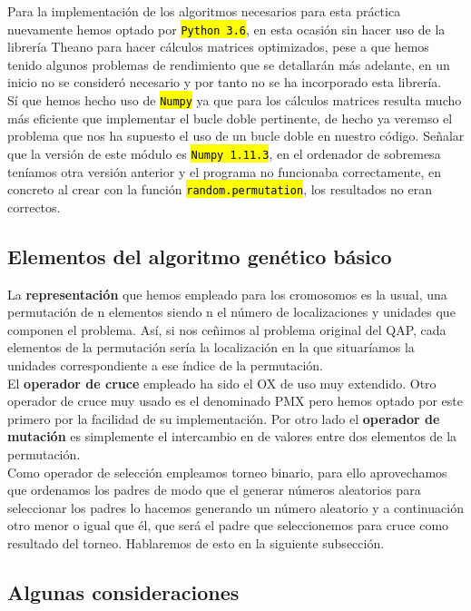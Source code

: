 \documentclass[10pt,a4paper]{article}
\newcommand{\code}[1]{\sethlcolor{light-gray}\hl{\texttt{#1}}} %
\begin{document}
Para la implementación de los algoritmos necesarios para esta práctica nuevamente hemos optado por \code{Python 3.6}, en esta ocasión sin hacer uso de la librería Theano para hacer cálculos matrices optimizados, pese a que hemos tenido algunos problemas de rendimiento que se detallarán más adelante, en un inicio no se consideró necesario y por tanto no se ha incorporado esta librería.\\

Sí que hemos hecho uso de \code{Numpy} ya que para los cálculos matrices resulta mucho más eficiente que implementar el bucle doble pertinente, de hecho ya veremso el problema que nos ha supuesto el uso de un bucle doble en nuestro código. Señalar que la versión de este módulo es \code{Numpy 1.11.3}, en el ordenador de sobremesa teníamos otra versión anterior y el programa no funcionaba correctamente, en concreto al crear con la función \code{random.permutation}, los resultados no eran correctos.

\subsection{Elementos del algoritmo genético básico}

La \textbf{representación} que hemos empleado para los cromosomos es la usual, una permutación de n elementos siendo n el número de localizaciones y unidades que componen el problema. Así, si nos ceñimos al problema original del QAP, cada elementos de la permutación sería la localización en la que situaríamos la unidades correspondiente a ese índice de la permutación.\\

El \textbf{operador de cruce} empleado ha sido el OX de uso muy extendido. Otro operador de cruce muy usado es el denominado PMX pero hemos optado por este primero por la facilidad de su implementación. Por otro lado el \textbf{operador de mutación} es simplemente el intercambio en de valores entre dos elementos de la permutación.\\

Como operador de selección empleamos torneo binario, para ello aprovechamos que ordenamos los padres de modo que el generar números aleatorios para seleccionar los padres lo hacemos generando un número aleatorio y a continuación otro menor o igual que él, que será el padre que seleccionemos para cruce como resultado del torneo. Hablaremos de esto en la siguiente subsección.

\subsection{Algunas consideraciones}
\end{document}
